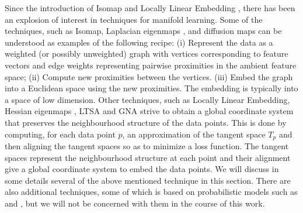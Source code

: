%
%
\noindent
Since the introduction of Isomap
\citep{tenebaum00:_global_geomet_framew_nonlin_dimen_reduc} and
Locally Linear Embedding \citep{roweis00:_nonlin}, there has been an
explosion of interest in techniques for manifold learning. Some of the
techniques, such as Isomap, Laplacian eigenmaps
\citep{belkin03:_laplac}, and diffusion maps \citep{coifman06:_diffus_maps}
can be understood as examples of the following recipe: (i) Represent
the data as a weighted (or possibly unweighted) graph with vertices
corresponding to feature vectors and edge weights representing
pairwise proximities in the ambient feature space; (ii) Compute new
proximities between the vertices. (iii) Embed the graph into a
Euclidean space using the new proximities. The embedding is typically
into a space of low dimension. Other techniques, such as Locally
Linear Embedding, Hessian eigenmaps \citep{donoho03:_hesian}, LTSA
\citep{zhang03:_intel_data_engin_autom_learn} and GNA \citep{brand05:_from} strive to obtain a global
coordinate system that preserves the neighbourhood structure of the
data points. This is done by computing, for each data point $p$, an
approximation of the tangent space $T_p$ and then aligning the tangent
spaces so as to minimize a loss function. The tangent spaces represent
the neighbourhood structure at each point and their alignment give a
global coordinate system to embed the data points. We will discuss in
some details several of the above mentioned technique in this section.
There are also additional techniques, some of which is based on probabilistic models such as 
\citep{tipping99:_mixtur} and \citep{brand05:_chart}, but we will not
be concerned with them in the course of this work.

